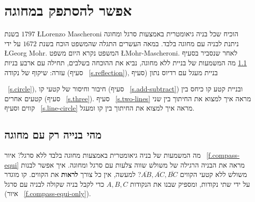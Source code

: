 


\chapter{אפשר להסתפק במחוגה}\label{c.compass}


בשנת
$1797$
\L{Lorenzo Mascheroni}
הוכיח שכל בניה גיאומטרית באמצעות סרגל ומחוגה ניתנת לבניה עם מחוגה בלבד. במאה העשרים התגלה שהמשפט הוכח בשנת
$1672$
על ידי
\L{Georg Mohr}.
המשפט נקרא היום משפט
\L{Mohr-Mascheroni}.
לאחר שנסביר בסעיף%
~\ref{s.compass-what}
מה המשמעות של בניית ללא מחוגה, נביא את ההוכחה בשלבים, תחילה עם ארבע בניות עזרה: שיקוף של נקודה (סעיף%
~\ref{s.reflection}),
בניית מעגל עם רדיוס נתון (סעיף%

~\ref{s.circle}),
חיבור וחיסור של קטעי קו (סעיף%
~\ref{s.add-subtract})
ובניית קטע קו כיחס בין קטעים אחרים (סעיף%
~\ref{s.three}).
סעיף%
~\ref{s.two-lines}
מראה איך למצוא את החיתוך בין שני קווים וסעיף%
~\ref{s.line-circle}
מראה איך למצוא את החיתוך בין קו ומעגל.


\section{מהי בנייה רק עם מחוגה}\label{s.compass-what}

מה המשמעות של בניה גיאומטרית באמצעות  מחוגה בלבד ללא סרגל? איור%
~\ref{f.compass-equi}
מראה את הבניה הרגילה של משולש שווה צלעות עם סרגל ומחוגה. איך אפשר לבנות משולש ללא קטעי הקווים
$\overline{AB},\overline{AC},\overline{BC}$?
למעשה, אין כל צורך
\textbf{לראות}
את הקווים. קו מוגדר על ידי שתי נקודות, ומספיק שבנו את הנקודות 
$A,B,C$
 כדי לקבל בניה שקולה לבניה עם סרגל (איור%
~\ref{f.compass-equi-only}).

